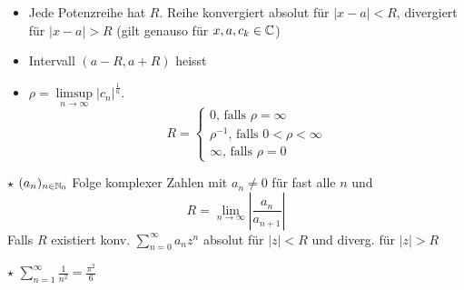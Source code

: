 \Satz
\vspace{-0.6em}
\begin{itemize}
    \item Jede Potenzreihe hat  $R$. Reihe konvergiert absolut für $|x-a| < R$, divergiert für $|x-a| > R$ (gilt genauso für $x, a, c_k \in \mathbb{C}$)
    \item Intervall $(a-R, a+R)$ heisst 
    \item $\rho = \limsup\limits_{n\to\infty} |c_n|^\frac{1}{n}$. \vspace{-2em}
        \begin{equation*}R = \begin{cases}
            0\text{, falls } \rho = \infty \\
            \rho^{-1}\text{, falls } 0 < \rho < \infty \\
            \infty\text{, falls } \rho = 0
        \end{cases}\end{equation*}
\end{itemize}

\Satz $\star$ $(a_n)_{n\in\mathbb{N}_0}$ Folge komplexer Zahlen mit $a_n \ne 0$ für fast alle $n$ und
$$R = \lim_{n\to\infty} \left|\frac{a_n}{a_{n+1}}\right|$$
Falls $R$ existiert konv. $\sum^\infty_{n=0} a_nz^n$ absolut für $|z| < R$ und diverg. für $|z| > R$

\Satz $\star$ $\sum_{n=1}^\infty \frac{1}{n^2} = \frac{\pi^2}{6}$
